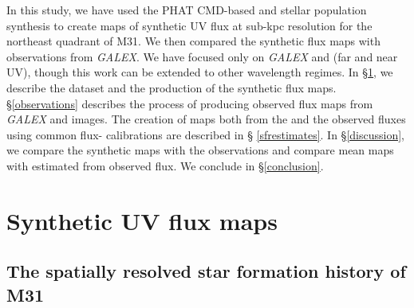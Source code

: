 \documentclass[iop, tighten]{emulateapj}
\begin{document}


In this study, we have used the PHAT CMD-based  and stellar population
synthesis to create maps of synthetic UV flux at sub-kpc resolution for the
northeast quadrant of M31. We then compared the synthetic flux maps with
observations from \emph{GALEX}. We have focused only on \emph{GALEX} \fuv{} and
\nuv{} (far and near UV), though this work can be extended to other wavelength
regimes. In \S \ref{syntheticfluxmaps}, we describe the \sfh{} dataset and the
production of the synthetic flux maps. \S \ref{observations} describes the
process of producing observed flux maps from \emph{GALEX} \fuv{} and \nuv{}
images. The creation of \sfr{} maps both from the  and the observed
fluxes using common flux-\sfr{} calibrations are described in \S
\ref{sfrestimates}. In \S \ref{discussion}, we compare the synthetic maps with
the observations and compare mean \sfr{} maps with  estimated from
observed flux. We conclude in \S \ref{conclusion}.






\section{Synthetic UV flux maps}\label{syntheticfluxmaps}



\subsection{The spatially resolved star formation history of M31}\label{syntheticfluxmaps:sfhs}
\end{document}
